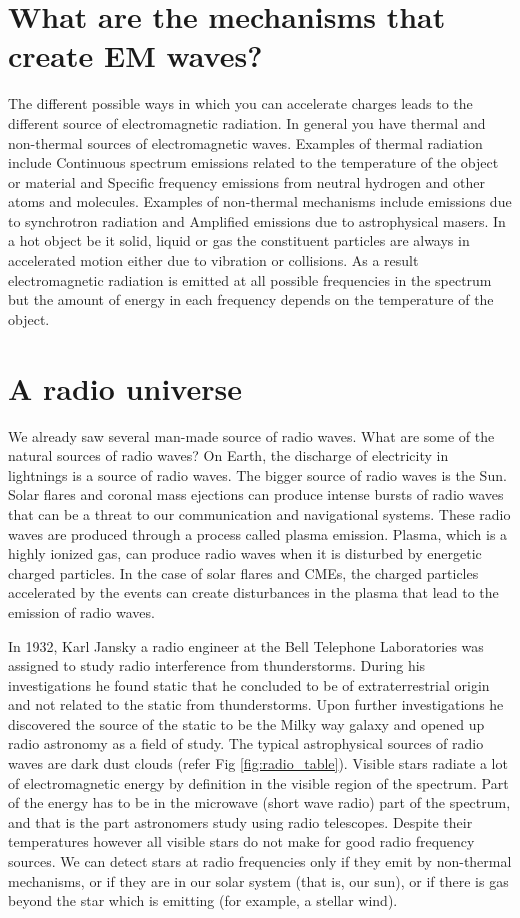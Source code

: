 \documentclass{../template/texnote}
\begin{document}
\section{What are the mechanisms that create EM waves?}
The different possible ways in which you can accelerate charges leads to the different source of electromagnetic radiation. In general you have thermal and non-thermal sources of electromagnetic waves. Examples of thermal radiation include Continuous spectrum emissions related to the temperature of the object or material and Specific frequency emissions from neutral hydrogen and other atoms and molecules. Examples of non-thermal mechanisms include emissions due to synchrotron radiation and Amplified emissions due to astrophysical masers. In a hot object be it solid, liquid or gas the constituent particles are always in accelerated motion either due to vibration or collisions. As a result electromagnetic radiation is emitted at all possible frequencies in the spectrum but the amount of energy in each frequency depends on the temperature of the object.
\section{A radio universe}
We already saw several man-made source of radio waves. What are some of the natural sources of radio waves? On Earth, the discharge of electricity in lightnings is a source of radio waves. The bigger source of radio waves is the Sun. Solar flares and coronal mass ejections can produce intense bursts of radio waves that can be a threat to our communication and navigational systems. These radio waves are produced through a process called plasma emission. Plasma, which is a highly ionized gas, can produce radio waves when it is disturbed by energetic charged particles. In the case of solar flares and CMEs, the charged particles accelerated by the events can create disturbances in the plasma that lead to the emission of radio waves.


In 1932, Karl Jansky a radio engineer at the Bell Telephone Laboratories was assigned to study radio interference from thunderstorms. During his investigations he found static that he concluded to be of extraterrestrial origin and not related to the static from thunderstorms. Upon further investigations he discovered the source of the static to be the Milky way galaxy and opened up radio astronomy as a field of study. The typical astrophysical sources of radio waves are dark dust clouds (refer Fig \ref{fig:radio_table}). Visible stars radiate a lot of electromagnetic energy by definition in the visible region of the spectrum. Part of the energy has to be in the microwave (short wave radio) part of the spectrum, and that is the part astronomers study using radio telescopes. Despite their temperatures however all visible stars do not make for good radio frequency sources. We can detect stars at radio frequencies only if they emit by non-thermal mechanisms, or if they are in our solar system (that is, our sun), or if there is gas beyond the star which is emitting (for example, a stellar wind).
\end{document}
